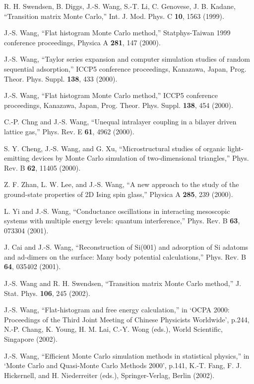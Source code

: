 \itm R. H. Swendsen, B. Diggs, J.-S. Wang, S.-T. Li, C. Genovese, J. B. Kadane, 
  ``Transition matrix Monte Carlo,'' Int. J. Mod. Phys. C {\bf 10}, 1563 (1999). 

\itm J.-S. Wang, ``Flat histogram Monte Carlo method,'' 
  Statphys-Taiwan 1999 conference proceedings, Physica A {\bf 281}, 147 (2000). 

\itm J.-S. Wang, ``Taylor series expansion and computer simulation 
   studies of random sequential adsorption,'' 
   ICCP5 conference proceedings, Kanazawa, Japan, 
   Prog. Theor. Phys. Suppl. {\bf 138}, 433 (2000). 

\itm J.-S. Wang, ``Flat histogram Monte Carlo method,'' 
   ICCP5 conference proceedings, Kanazawa, Japan, 
   Prog. Theor. Phys. Suppl. {\bf 138}, 454 (2000). 

\itm C.-P. Chng and J.-S. Wang, ``Unequal intralayer coupling in a 
   bilayer driven lattice gas,'' Phys. Rev. E {\bf 61}, 4962 (2000). 

\itm S. Y. Cheng, J.-S. Wang, and G. Xu, 
  ``Microstructural studies of organic light-emitting devices by 
  Monte Carlo simulation of two-dimensional triangles,'' 
  Phys. Rev. B {\bf 62}, 11405 (2000).

\itm Z. F. Zhan, L. W. Lee, and J.-S. Wang, ``A new approach to the 
   study of the ground-state properties of 2D Ising spin glass,'' 
   Physica A {\bf 285}, 239 (2000).  

\itm L. Yi and J.-S. Wang, ``Conductance oscillations in interacting
mesoscopic systems with multiple energy levels: quantum interference,''
Phys. Rev. B {\bf 63}, 073304 (2001).

\itm J. Cai and J.-S. Wang, ``Reconstruction of Si(001) and adsorption
of Si adatoms and ad-dimers on the surface: Many body potential calculations,''
Phys. Rev. B {\bf 64}, 035402 (2001).

\itm J.-S. Wang and R. H. Swendsen, ``Transition matrix Monte Carlo method,'' 
J. Stat. Phys. {\bf 106}, 245 (2002).

\itm J.-S. Wang, ``Flat-histogram and free energy calculation,'' in 
`OCPA 2000: Proceedings of the Third Joint Meeting of Chinese Physicists 
Worldwide', p.244, N.-P. Chang, K. Young, H. M. Lai, C.-Y. Wong
(eds.), World Scientific, Singapore (2002). 

\itm J.-S. Wang, ``Efficient Monte Carlo simulation methods in statistical 
physics,'' in `Monte Carlo and Quasi-Monte Carlo Methods 2000', p.141,
K.-T. Fang, F. J. Hickernell, and H. Niederreiter (eds.), Springer-Verlag,
Berlin (2002).

